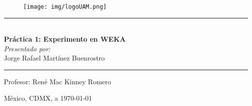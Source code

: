 \documentclass[letterpaper,11pt,spanish]{report}
\begin{document}
\thispagestyle{empty}

\begin{figure}[h]
    \centering
    \texttt{[image: img/logoUAM.png]}
\end{figure}

\begin{center}
    \rule{\textwidth}{0.5pt}
    \\[0.7em]
    {\LARGE\bfseries Pr\'actica 1: Experimento en WEKA}\\[1cm]
    {\normalsize\itshape Presentado por:}\\
    {\large Jorge Rafael Martínez Buenrostro}
    \rule{\textwidth}{0.5pt}
\end{center}

\vspace{2cm}
\begin{center}
    {\large Profesor: Ren\'e Mac Kinney Romero}    
\end{center}

\vfill  
\begin{center}
    México, CDMX, a \today
\end{center}

\vspace{2cm}

\setcounter{page}{0}
\pagestyle{plain}
\end{document}
